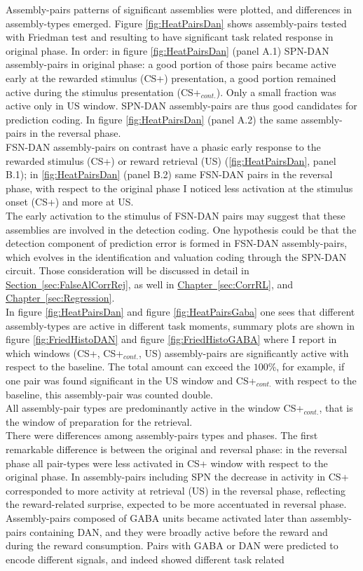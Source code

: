 Assembly-pairs patterns of significant assemblies were plotted, and differences in assembly-types emerged. Figure \ref{fig:HeatPairsDan} shows assembly-pairs tested with Friedman test and resulting to have significant task related response in original phase. In order: in figure \ref{fig:HeatPairsDan} (panel A.1) SPN-DAN assembly-pairs in original phase: a good portion of those pairs became active early at the rewarded stimulus (CS+) presentation, a good portion remained active during the stimulus presentation (CS+$_{cont.}$). Only a small fraction was active only in US window. SPN-DAN assembly-pairs are thus good candidates for prediction coding. In figure \ref{fig:HeatPairsDan} (panel A.2) the same assembly-pairs in the reversal phase.\\FSN-DAN assembly-pairs on contrast have a phasic early response to the rewarded stimulus (CS+) or reward retrieval (US) (\ref{fig:HeatPairsDan}, panel B.1); in \ref{fig:HeatPairsDan} (panel B.2) same FSN-DAN pairs in the reversal phase, with respect to the original phase I noticed less activation at the stimulus onset (CS+) and more at US.\\The early activation to the stimulus of FSN-DAN pairs may suggest that these assemblies are involved in the detection coding. One hypothesis could be that the detection component of prediction error is formed in FSN-DAN assembly-pairs, which evolves in the identification and valuation coding through the SPN-DAN circuit. Those consideration will be discussed in detail in \hyperref[sec:FalseAlCorrRej]{Section~\ref*{sec:FalseAlCorrRej}}, as well in \hyperref[sec:CorrRL]{Chapter~\ref*{sec:CorrRL}}, and \hyperref[sec:Regression]{Chapter~\ref*{sec:Regression}}.\\In figure \ref{fig:HeatPairsDan} and figure \ref{fig:HeatPairsGaba} one sees that different assembly-types are active in different task moments, summary plots are shown in figure \ref{fig:FriedHistoDAN} and figure \ref{fig:FriedHistoGABA} where I report in which windows (CS+, CS+$_{cont.}$, US) assembly-pairs are significantly active with respect to the baseline. The total amount can exceed the $100\%$, for example, if one pair was found significant in the US window and CS+$_{cont.}$ with respect to the baseline, this assembly-pair was counted double.\\All assembly-pair types are predominantly active in the window CS+$_{cont.}$, that is the window of preparation for the retrieval.\\There were differences among assembly-pairs types and phases. The first remarkable difference is between the original and reversal phase: in the reversal phase all pair-types were less activated in CS+ window with respect to the original phase. In assembly-pairs including SPN the decrease in activity in CS+ corresponded to more activity at retrieval (US) in the reversal phase, reflecting the reward-related surprise, expected to be more accentuated in reversal phase. Assembly-pairs composed of GABA units became activated later than assembly-pairs containing DAN, and they were broadly active before the reward and during the reward consumption. Pairs with GABA or DAN were predicted to encode different signals, and indeed showed different task related 